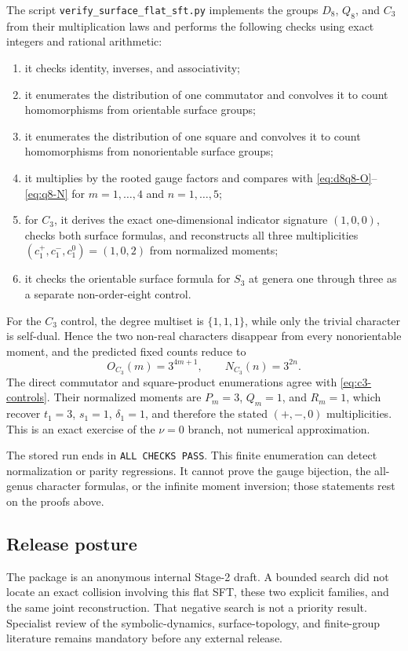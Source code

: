 The script \texttt{verify\_surface\_flat\_sft.py} implements the groups
$D_8$, $Q_8$, and $C_3$ from their multiplication laws and performs the following
checks using exact integers and rational arithmetic:
\begin{enumerate}
 \item it checks identity, inverses, and associativity;
 \item it enumerates the distribution of one commutator and convolves it to
 count homomorphisms from orientable surface groups;
 \item it enumerates the distribution of one square and convolves it to count
 homomorphisms from nonorientable surface groups;
 \item it multiplies by the rooted gauge factors and compares with
 \eqref{eq:d8q8-O}--\eqref{eq:q8-N} for $m=1,\ldots,4$ and
 $n=1,\ldots,5$;
 \item for $C_3$, it derives the exact one-dimensional indicator signature
 $(1,0,0)$, checks both surface formulas, and reconstructs all three
 multiplicities $(c_1^+,c_1^-,c_1^0)=(1,0,2)$ from normalized moments;
 \item it checks the orientable surface formula for $S_3$ at genera one
 through three as a separate non-order-eight control.
\end{enumerate}
For the $C_3$ control, the degree multiset is $\{1,1,1\}$, while only the
trivial character is self-dual.  Hence the two non-real characters disappear
from every nonorientable moment, and the predicted fixed counts reduce to
\begin{equation}
 O_{C_3}(m)=3^{4m+1},\qquad N_{C_3}(n)=3^{2n}.
 \label{eq:c3-controls}
\end{equation}
The direct commutator and square-product enumerations agree with
\eqref{eq:c3-controls}.  Their normalized moments are $P_m=3$, $Q_m=1$, and
$R_m=1$, which recover $t_1=3$, $s_1=1$, $\delta_1=1$, and therefore the
stated $(+,-,0)$ multiplicities.  This is an exact exercise of the
$\nu=0$ branch, not numerical approximation.

The stored run ends in \texttt{ALL CHECKS PASS}.  This finite enumeration can
detect normalization or parity regressions.  It cannot prove the gauge
bijection, the all-genus character formulas, or the infinite moment inversion;
those statements rest on the proofs above.

\subsection{Release posture}

The package is an anonymous internal Stage-2 draft.  A bounded search did not
locate an exact collision involving this flat SFT, these two explicit families,
and the same joint reconstruction.  That negative search is not a priority
result.  Specialist review of the symbolic-dynamics, surface-topology, and
finite-group literature remains mandatory before any external release.
